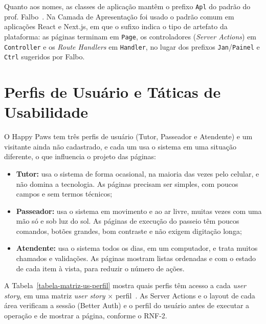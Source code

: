 Quanto aos nomes, as classes de aplicação mantêm o prefixo \texttt{Apl} do padrão do prof. Falbo~\cite{falbo:notas18}. Na Camada de Apresentação foi usado o padrão comum em aplicações React e Next.js, em que o sufixo indica o tipo de artefato da plataforma: as páginas terminam em \texttt{Page}, os controladores (\textit{Server Actions}) em \texttt{Controller} e os \textit{Route Handlers} em \texttt{Handler}, no lugar dos prefixos \texttt{Jan}/\texttt{Painel} e \texttt{Ctrl} sugeridos por Falbo.


\section{Perfis de Usuário e Táticas de Usabilidade}
\label{sec-ihc-usabilidade}

O Happy Paws tem três perfis de usuário (Tutor, Passeador e Atendente) e um visitante ainda não cadastrado, e cada um usa o sistema em uma situação diferente, o que influencia o projeto das páginas:

\begin{itemize}
	\item \textbf{Tutor:} usa o sistema de forma ocasional, na maioria das vezes pelo celular, e não domina a tecnologia. As páginas precisam ser simples, com poucos campos e sem termos técnicos;
	\item \textbf{Passeador:} usa o sistema em movimento e ao ar livre, muitas vezes com uma mão só e sob luz do sol. As páginas de execução do passeio têm poucos comandos, botões grandes, bom contraste e não exigem digitação longa;
	\item \textbf{Atendente:} usa o sistema todos os dias, em um computador, e trata muitos chamados e validações. As páginas mostram listas ordenadas e com o estado de cada item à vista, para reduzir o número de ações.
\end{itemize}

A Tabela~\ref{tabela-matriz-us-perfil} mostra quais perfis têm acesso a cada \textit{user story}, em uma matriz \textit{user story} $\times$ perfil~\cite{falbo:notas18}. As Server Actions e o layout de cada área verificam a sessão (Better Auth) e o perfil do usuário antes de executar a operação e de mostrar a página, conforme o RNF-2.

